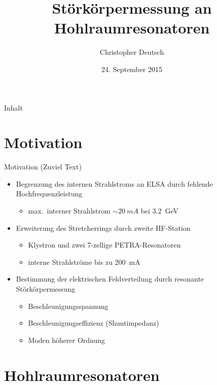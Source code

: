 \documentclass[12pt,xcolor=dvipsnames,professionalfonts]{beamer}
\author[Christopher Deutsch]
{Christopher Deutsch}
\title
{Störkörpermessung an Hohlraumresonatoren}
\subtitle
{}
\institute[]
{Rheinische Friedrich-Wilhelms-Universität Bonn \\
Seminar zur Bachelorarbeit SS15}
\date{24. September 2015}
\begin{document}
\maketitle

\begin{frame}{Inhalt}
	\tableofcontents
\end{frame}

\section{Motivation}
\begin{frame}{Motivation (Zuviel Text)}
	\begin{itemize}
		\item Begrenzung des internen Strahlstroms an ELSA durch fehlende Hochfrequenzleistung
		\begin{itemize}
			\setlength\itemsep{0.25em}
			\item max.\ interner Strahlstrom  $\sim\SI{20}{mA}$ bei \SI{3.2}{GeV}
		\end{itemize}
		\vfill
		
		\item Erweiterung des Stretcherrings durch zweite HF-Station
		\begin{itemize}
			\setlength\itemsep{0.25em}
			\item Klystron und zwei 7-zellige PETRA-Resonatoren
			\item interne Strahlströme bis zu \SI{200}{mA}
		\end{itemize}
		\vfill
		
		\item Bestimmung der elektrischen Feldverteilung durch resonante Störkörpermessung
		\begin{itemize}
			\setlength\itemsep{0.25em}
			\item Beschleunigungsspannung
			\item Beschleunigungseffizienz (Shuntimpedanz)
			\item Moden höherer Ordnung
		\end{itemize}
	\end{itemize}
\end{frame}


\section{Hohlraumresonatoren}
\end{document}
